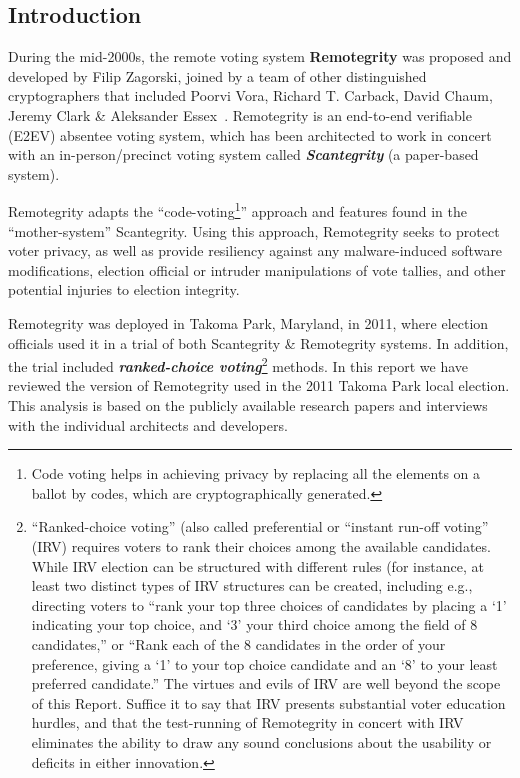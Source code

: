 \subsection{Introduction}

During the mid-2000s, the remote voting system \textbf{Remotegrity }was proposed and developed by Filip Zagorski, joined by a team of other distinguished cryptographers that included Poorvi Vora, Richard T. Carback, David Chaum, Jeremy Clark \& Aleksander Essex~\cite{zagorski2013}. Remotegrity is an end-to-end verifiable (E2EV) absentee voting system, which has been architected to work in concert with an in-person/precinct voting system called \textbf{\textit{Scantegrity }}(a paper-based system).

Remotegrity adapts the ``code-voting\footnote{Code voting helps in achieving privacy by replacing all the elements on a ballot by codes, which are cryptographically generated.}'' approach and features found in the ``mother-system'' Scantegrity. Using this approach, Remotegrity seeks to protect voter privacy, as well as provide resiliency against any malware-induced software modifications, election official or intruder manipulations of vote tallies, and other potential injuries to election integrity.

Remotegrity was deployed in Takoma Park, Maryland, in 2011, where election officials used it in a trial of both Scantegrity \& Remotegrity systems. In addition, the trial included \textbf{\textit{ranked-choice voting}}\footnote{``Ranked-choice voting'' (also called preferential or ``instant run-off voting'' (IRV) requires voters to rank their choices among the available candidates. While IRV election can be structured with different rules (for instance, at least two distinct types of IRV structures can be created, including e.g., directing voters to ``rank your top three choices of candidates by placing a `1' indicating your top choice, and `3' your third choice among the field of 8 candidates,'' or ``Rank each of the 8 candidates in the order of your preference, giving a `1' to your top choice candidate and an `8' to your least preferred candidate.'' The virtues and evils of IRV are well beyond the scope of this Report. Suffice it to say that IRV presents substantial voter education hurdles, and that the test-running of Remotegrity in concert with IRV eliminates the ability to draw any sound conclusions about the usability or deficits in either innovation.} methods. In this report we have reviewed the version of Remotegrity used in the 2011 Takoma Park local election. This analysis is based on the publicly available research papers and interviews with the individual architects and developers.

